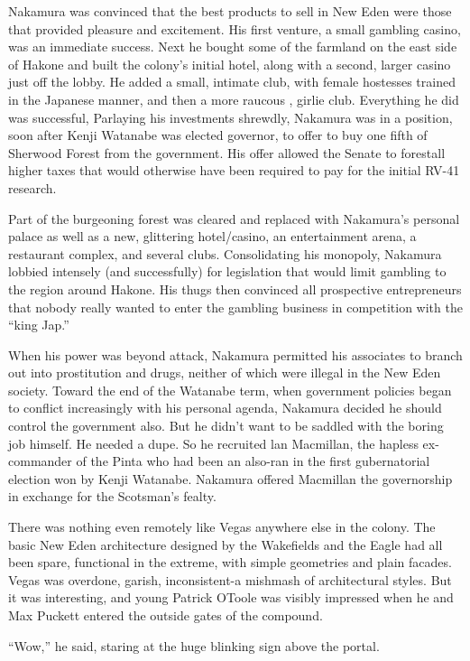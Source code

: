 \documentclass[]{article}
\begin{document}
{Nakamura was convinced that the best products to sell in New Eden were those that provided pleasure and excitement. His first venture, a small gambling casino, was an immediate success. Next he bought some of the farmland on the east side of Hakone and built the colony’s initial hotel, along with a second, larger casino just off the lobby. He added a small, intimate club, with female hostesses trained in the Japanese manner, and then a more raucous , girlie club. Everything he did was successful, Parlaying his investments shrewdly, Nakamura was in a position, soon after Kenji Watanabe was elected governor, to offer to buy one fifth of Sherwood Forest from the government. His offer allowed the Senate to forestall higher taxes that would otherwise have been required to pay for the initial RV-41 research.

Part of the burgeoning forest was cleared and replaced with Nakamura’s personal palace as well as a new, glittering hotel/casino, an entertainment arena, a restaurant complex, and several clubs. Consolidating his monopoly, Nakamura lobbied intensely (and successfully) for legislation that would limit gambling to the region around Hakone. His thugs then convinced all prospective entrepreneurs that nobody really wanted to enter the gambling business in competition with the “king Jap.”

When his power was beyond attack, Nakamura permitted his associates to branch out into prostitution and drugs, neither of which were illegal in the New Eden society. Toward the end of the Watanabe term, when government policies began to conflict increasingly with his personal agenda, Nakamura decided he should control the government also. But he didn’t want to be saddled with the boring job himself. He needed a dupe. So he recruited lan Macmillan, the hapless ex-commander of the Pinta who had been an also-ran in the first gubernatorial election won by Kenji Watanabe. Nakamura offered Macmillan the governorship in exchange for the Scotsman’s fealty.

There was nothing even remotely like Vegas anywhere else in the colony. The basic New Eden architecture designed by the Wakefields and the Eagle had all been spare, functional in the extreme, with simple geometries and plain facades. Vegas was overdone, garish, inconsistent-a mishmash of architectural styles. But it was interesting, and young Patrick OToole was visibly impressed when he and Max Puckett entered the outside gates of the compound.

“Wow,” he said, staring at the huge blinking sign above the portal.

}
\end{document}
